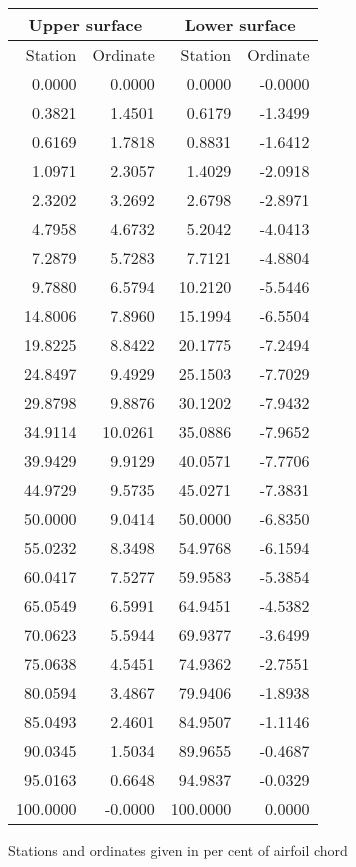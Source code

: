 \documentclass[11pt]{book}
\begin{document}
 \hspace{4mm}
 \begin{tabular}{|r|r|r|r|} \hline 
 \multicolumn{2}{|c|}{Upper surface} & \multicolumn{2}{|c|}{Lower surface} \\
 \hline
 Station & Ordinate & Station & Ordinate \\
 \hline
0.0000 & 0.0000 & 0.0000 & -0.0000 \\
0.3821 & 1.4501 & 0.6179 & -1.3499 \\
0.6169 & 1.7818 & 0.8831 & -1.6412 \\
1.0971 & 2.3057 & 1.4029 & -2.0918 \\
2.3202 & 3.2692 & 2.6798 & -2.8971 \\
4.7958 & 4.6732 & 5.2042 & -4.0413 \\
7.2879 & 5.7283 & 7.7121 & -4.8804 \\
9.7880 & 6.5794 & 10.2120 & -5.5446 \\
14.8006 & 7.8960 & 15.1994 & -6.5504 \\
19.8225 & 8.8422 & 20.1775 & -7.2494 \\
24.8497 & 9.4929 & 25.1503 & -7.7029 \\
29.8798 & 9.8876 & 30.1202 & -7.9432 \\
34.9114 & 10.0261 & 35.0886 & -7.9652 \\
39.9429 & 9.9129 & 40.0571 & -7.7706 \\
44.9729 & 9.5735 & 45.0271 & -7.3831 \\
50.0000 & 9.0414 & 50.0000 & -6.8350 \\
55.0232 & 8.3498 & 54.9768 & -6.1594 \\
60.0417 & 7.5277 & 59.9583 & -5.3854 \\
65.0549 & 6.5991 & 64.9451 & -4.5382 \\
70.0623 & 5.5944 & 69.9377 & -3.6499 \\
75.0638 & 4.5451 & 74.9362 & -2.7551 \\
80.0594 & 3.4867 & 79.9406 & -1.8938 \\
85.0493 & 2.4601 & 84.9507 & -1.1146 \\
90.0345 & 1.5034 & 89.9655 & -0.4687 \\
95.0163 & 0.6648 & 94.9837 & -0.0329 \\
100.0000 & -0.0000 & 100.0000 & 0.0000 \\
 \hline 
 \end{tabular}
 \vspace{8mm}

Stations and ordinates given in per cent of airfoil chord
\end{document}

